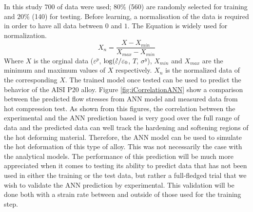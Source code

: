 \documentclass[twoside,english,1p,final,sort&compress]{elsarticle}
\theoremstyle{plain}
\newcommand{\mdot}[1]{\accentset{\mbox{\bfseries .}}{#1}}
\begin{document}
In this study $700$ of data were used; $80\%$ (560) are randomly selected for training and $20\%$ (140) for testing.
Before learning, a normalisation of the data is required in order to have all data between $0$ and $1$.
The Equation is widely used for normalization.
\begin{equation}
X_n = \frac{X - X_{min}}{X_{max} - X_{min}}
\end{equation}
Where $X$ is the orginal data ($\varepsilon^p$, $\log(\mdot\varepsilon/\varepsilon_0$,  $T$, $\sigma^y$), $X_{min}$ and $X_{max}$ are the minimum and maximum values of $X$ respectively.
$X_n$ is the normalized data of the corresponding $X$.
The trained model once tested can be used to predict the behavior of the AISI P20 alloy.
Figure \ref{fig:iCorrelationANN} show a comparison between the predicted ﬂow stresses from ANN model and measured data from hot compression test.
As shown from this figures, the correlation between the experimental and the ANN prediction based is very good over the full range of data and the predicted data can well track the hardening and softening regions of the hot deforming material.
Therefore, the ANN model can be used to simulate the hot deformation of this type of alloy.
This was not necessarily the case with the analytical models.
The performance of this prediction will be much more appreciated when it comes to testing its ability to predict data that has not been used in either the training or the test data, but rather a full-fledged trial that we wish to validate the ANN prediction by experimental.
This validation will be done both with a strain rate between and outside of those used for the training step.
\end{document}
